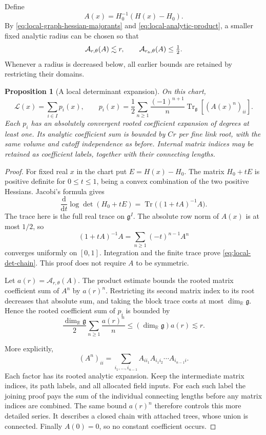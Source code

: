 \documentclass[11pt,reqno]{amsart}
\numberwithin{equation}{section}
\newtheorem{proposition}[theorem]{Proposition}
\theoremstyle{definition}
\theoremstyle{remark}
\newcommand{\R}{\mathbb R}
\newcommand{\dd}{\mathrm d}
\newcommand{\g}{\mathfrak g}
\begin{document}
Define
\[
                 A(x)=H_0^{-1}(H(x)-H_0).
\]
By \eqref{eq:local-graph-hessian-majorants} and
\eqref{eq:local-analytic-product}, a smaller fixed
analytic radius can be chosen so that
\begin{equation}
       \mathcal A_{r,\theta}(A)\lesssim r,\qquad
       \mathcal A_{r_{\rm a},\theta}(A)\le\tfrac12 .
 \label{eq:local-det-smallness}
\end{equation}
Whenever a radius is decreased below, all earlier
bounds are retained by restricting their domains.

\begin{proposition}[A local determinant expansion]
\label{prop:local-determinant}
On this chart,
\begin{equation}
 \mathcal L(x)=\sum_{i\in I}p_i(x),\qquad
 p_i(x)=\frac12\sum_{n\ge1}\frac{(-1)^{n+1}}n
                         \operatorname{Tr}_{\g}[(A(x)^n)_{ii}].
 \label{eq:local-det-chain}
\end{equation}
Each \(p_i\) has an absolutely convergent rooted
coefficient expansion of degrees at least one.
Its analytic coefficient sum is bounded by \(Cr\)
per fine link root, with the same volume and cutoff
independence as before.
Internal matrix indices may be retained as coefficient
labels, together with their connecting lengths.
\end{proposition}
\begin{proof}
For fixed real \(x\) in the chart put
\(E=H(x)-H_0\).
The matrix \(H_0+tE\) is positive definite for
\(0\le t\le1\), being a convex combination of
the two positive Hessians.
Jacobi's formula gives
\[
 \frac{\dd}{\dd t}\log\det(H_0+tE)
       =\operatorname{Tr}\bigl((1+tA)^{-1}A\bigr).
\]
The trace here is the full real trace on
\(\g^I\). The absolute row norm of \(A(x)\)
is at most \(1/2\), so
\[
          (1+tA)^{-1}A
                =\sum_{n\ge1}(-t)^{n-1}A^n
\]
converges uniformly on \([0,1]\).
Integration and the finite trace prove
\eqref{eq:local-det-chain}.
This proof does not require \(A\) to be symmetric.

Let \(a(r)=\mathcal A_{r,\theta}(A)\).
The product estimate bounds the rooted matrix
coefficient sum of \(A^n\) by \(a(r)^n\).
Restricting its second matrix index to its root
decreases that absolute sum, and taking the
block trace costs at most \(\dim_{\R}\g\).
Hence the rooted coefficient sum of \(p_i\) is
bounded by
\[
       \frac{\dim_{\R}\g}{2}
                 \sum_{n\ge1}\frac{a(r)^n}{n}
                     \le(\dim_{\R}\g)a(r)\lesssim r .
\]

More explicitly,
\[
 (A^n)_{ii}=\sum_{i_1,\ldots,i_{n-1}}
          A_{ii_1}A_{i_1i_2}\cdots A_{i_{n-1}i}.
\]
Each factor has its rooted analytic expansion.
Keep the intermediate matrix indices, its path
labels, and all allocated field inputs.
For each such label the joining proof pays the
sum of the individual connecting lengths before
any matrix indices are combined.
The same bound \(a(r)^n\) therefore controls this
more detailed series.
It describes a closed chain with attached trees,
whose union is connected.
Finally \(A(0)=0\), so no constant coefficient occurs.
\end{proof}
\end{document}
